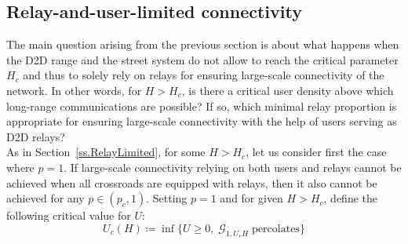 \documentclass[conference]{IEEEtran}
\begin{document}
\subsection{Relay-and-user-limited connectivity}
\label{ss.Relay-and-Users}
The main question arising from the previous section is about what happens when the D2D range and the street system do not allow to reach the critical parameter $H_c$ and thus to solely rely on relays for ensuring large-scale connectivity of the network. In other words, for $H>H_c$, is there a critical user density above which long-range communications are possible? If so, which minimal relay proportion is appropriate for ensuring large-scale connectivity with the help of users serving as D2D relays? \\
\indent As in Section~\ref{ss.RelayLimited}, for some $H>H_c$, let us consider first the case where $p=1$. If large-scale connectivity relying on both users and relays cannot be achieved when all crossroads are equipped with relays, then it also cannot be achieved for any $p \in (p_c,1)$. Setting $p=1$ and for given $H>H_c$, define the following critical value for $U$:
\begin{equation}
\label{critical-U}
U_c(H) \coloneqq \inf \lbrace U \geq 0, \; \mathcal{G}_{1,U,H} \; \text{percolates} \rbrace  
\end{equation}
\end{document}
